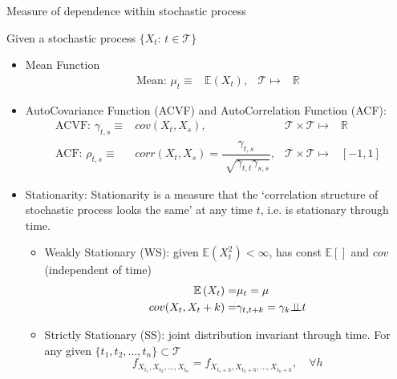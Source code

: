 \begin{point}
    Measure of dependence within stochastic process
\end{point}

    Given a stochastic process $ \{X_t:\,t\in \mathcal{T}\} $

    \begin{itemize}[topsep=2pt,itemsep=0pt]
        \item Mean Function
        \begin{align}
            \text{Mean: }\mu _t\equiv &\mathbb{E}\left( X_t \right),&\mathcal{T}\mapsto  &\mathbb{R}
        \end{align}        
        
        \item AutoCovariance Function (ACVF) and AutoCorrelation Function (ACF):
        \begin{align}
            \text{ACVF: }\gamma _{t,s}\equiv &cov(X_t,X_s),& \mathcal{T}\times \mathcal{T}\mapsto&\mathbb{R}\\
            \text{ACF: }\rho  _{t,s}\equiv &corr(X_t,X_s)=\dfrac{\gamma _{t,s}}{\sqrt[]{\gamma _{t,t}\gamma _{s,s}}},& \mathcal{T}\times \mathcal{T}\mapsto& [-1,1]
        \end{align}

        \item Stationarity: Stationarity is a measure that the `correlation structure of stochastic process looks the same' at any time $ t $, i.e. is stationary through time.
        \begin{itemize}[topsep=2pt,itemsep=0pt]
            \item Weakly Stationary (WS): given $ \mathbb{E}\left( X_t^2 \right) < \infty $, has const $ \mathbb{E}\left[  \right]  $ and $ cov  $ (independent of time)
            \begin{align}
                \mathbb{E}\left( X_t \right) =&\mu _t=\mu \\
                cov(X_t,X_t+k)=&\gamma _{t,t+k}=\gamma _k\bot\!\!\!\bot t
            \end{align}

            \item Strictly Stationary (SS): joint distribution invariant through time. For any given $ \{t_1,t_2,\ldots,t_n\}\subset \mathcal{T} $
            \begin{equation}
                f_{X_{t_1},X_{t_2},\ldots,X_{t_n}}=f_{X_{t_1+h},X_{t_2+h},\ldots,X_{t_n+h}},\quad \forall h 
            \end{equation}
            

\end{itemize}
\end{itemize}
